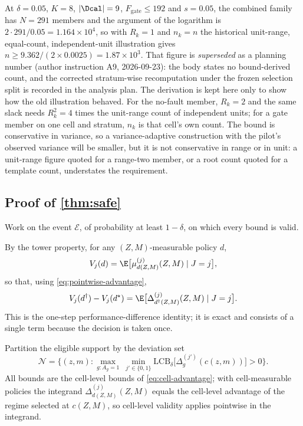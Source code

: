 \medskip
At $\delta=0.05$, $K=8$, $|\Dcal|=9$, $F_{\mathrm{gate}}\le 192$ and $s=0.05$, the
combined family has $N=291$ members and the argument of the logarithm is
$2\cdot291/0.05=1.164\times10^{4}$, so with $R_k=1$ and $n_k=n$ the historical
unit-range, equal-count, independent-unit illustration gives
$n\ge 9.362/(2\times0.0025)=1.87\times10^{3}$.  That figure is \emph{superseded}
as a planning number (author instruction A9, 2026-09-23): the body states no
bound-derived count, and the corrected stratum-wise recomputation under the
frozen selection split is recorded in the analysis plan.  The derivation is kept
here only to show how the old illustration behaved.  For the no-fault member,
$R_k=2$ and the same slack needs $R_k^2=4$ times the unit-range count of
independent units; for a gate member on one cell and stratum, $n_k$ is that
cell's own count.  The bound
is conservative in variance, so a variance-adaptive construction with the
pilot's observed variance will be smaller, but it is not conservative in range
or in unit: a unit-range figure quoted for a range-two member, or a root count
quoted for a template count, understates the requirement.

\subsection{Proof of \texorpdfstring{\cref{thm:safe}}{the safe-branching theorem}}

Work on the event $\mathcal E$, of probability at least $1-\delta$, on which
every bound is valid.

By the tower property, for any $(Z,M)$-measurable policy $d$,
\begin{equation}
 V_j(d)=\E\big[\mu^{(j)}_{d(Z,M)}(Z,M)\mid J=j\big],
\end{equation}
so that, using \eqref{eq:pointwise-advantage},
\begin{equation}
 V_j(d^\dagger)-V_j(d^\star)
 =\E\big[\Delta^{(j)}_{d^\dagger(Z,M)}(Z,M)\mid J=j\big].
 \label{eq:one-step-pd}
\end{equation}
This is the one-step performance-difference identity; it is exact and consists
of a single term because the decision is taken once.

Partition the eligible support by the deviation set
\begin{equation}
 \mathcal N=\Big\{(z,m):\max_{g:A_g=1}\ \min_{j'\in\{0,1\}}
 \mathrm{LCB}_\delta\big[\Delta^{(j')}_g(c(z,m))\big]>0\Big\}.
\end{equation}
All bounds are the cell-level bounds of \eqref{eq:cell-advantage}; with
cell-measurable policies the integrand $\Delta^{(j)}_{d(Z,M)}(Z,M)$ equals the
cell-level advantage of the regime selected at $c(Z,M)$, so cell-level validity
applies pointwise in the integrand.

